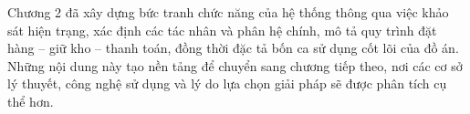 \documentclass[../DoAn.tex]{subfiles}
\begin{document}
Chương 2 đã xây dựng bức tranh chức năng của hệ thống thông qua việc khảo sát hiện trạng, xác định các tác nhân và phân hệ chính, mô tả quy trình đặt hàng -- giữ kho -- thanh toán, đồng thời đặc tả bốn ca sử dụng cốt lõi của đồ án. Những nội dung này tạo nền tảng để chuyển sang chương tiếp theo, nơi các cơ sở lý thuyết, công nghệ sử dụng và lý do lựa chọn giải pháp sẽ được phân tích cụ thể hơn.
\end{document}
